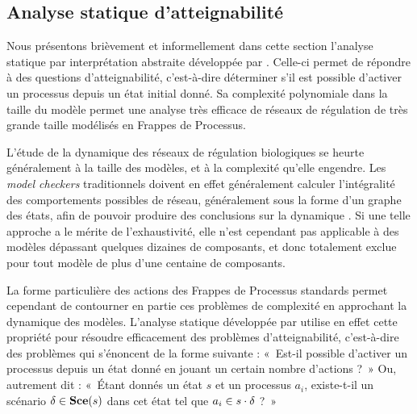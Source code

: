 


\subsection{Analyse statique d'atteignabilité}



Nous présentons brièvement et informellement dans cette section
l'analyse statique par interprétation abstraite
développée par .
Celle-ci permet de répondre à des questions d'atteignabilité,
c'est-à-dire déterminer s'il est possible d'activer un processus depuis un état initial donné.
Sa complexité polynomiale dans la taille du modèle
permet une analyse très efficace de réseaux de régulation de très grande taille
modélisés en Frappes de Processus.

\myskip

L'étude de la dynamique des réseaux de régulation biologiques se heurte généralement
à la taille des modèles, et à la complexité qu'elle engendre.
Les \textit{model checkers} traditionnels doivent en effet généralement calculer
l'intégralité des comportements possibles de réseau,
généralement sous la forme d'un graphe des états,
afin de pouvoir produire des conclusions sur la dynamique \cite{Richard06}.
Si une telle approche a le mérite de l'exhaustivité,
elle n'est cependant pas applicable à des modèles dépassant quelques dizaines de composants,
et donc totalement exclue pour tout modèle de plus d'une centaine de composants.

La forme particulière des actions des Frappes de Processus standards
permet cependant de contourner en partie ces problèmes de complexité en approchant
la dynamique des modèles.
L'analyse statique développée par  utilise en effet
cette propriété pour résoudre efficacement des problèmes d'atteignabilité,
c'est-à-dire des problèmes qui s'énoncent de la forme suivante :
«~Est-il possible d'activer un processus depuis un état donné en jouant
un certain nombre d'actions ?~»
Ou, autrement dit :
«~Étant donnés un état $s$ et un processus $a_i$,
existe-t-il un scénario $\delta \in \mathbf{Sce}(s)$ dans cet état
tel que $a_i \in s \cdot \delta$ ?~»

